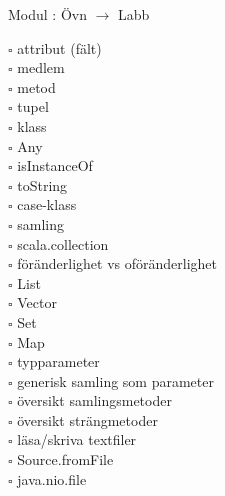 
Modul : Övn  $\rightarrow$ Labb 
\begin{multicols}{3}\SlideFontTiny
$\square$ attribut (fält) \\
$\square$ medlem \\
$\square$ metod \\
$\square$ tupel \\
$\square$ klass \\
$\square$ Any \\
$\square$ isInstanceOf \\
$\square$ toString \\
$\square$ case-klass \\
$\square$ samling \\
$\square$ scala.collection \\
$\square$ föränderlighet vs oföränderlighet \\
$\square$ List \\
$\square$ Vector \\
$\square$ Set \\
$\square$ Map \\
$\square$ typparameter \\
$\square$ generisk samling som parameter \\
$\square$ översikt samlingsmetoder \\
$\square$ översikt strängmetoder \\
$\square$ läsa/skriva textfiler \\
$\square$ Source.fromFile \\
$\square$ java.nio.file \\     
\end{multicols}

